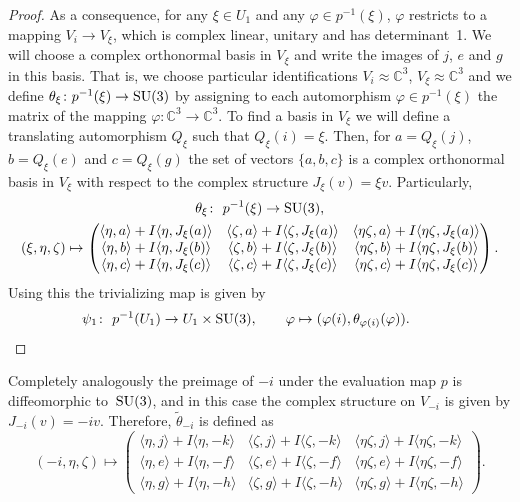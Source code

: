 \documentclass[10pt,a4paper]{amsart}
\numberwithin{equation}{section}
\newcommand{\SC}{\mathbb{C}} %
\begin{document}
\begin{proof}
As a consequence, for any $\xi \in U_1 $ and any $\varphi \in p^{-1}(\xi)$, $\varphi$ restricts to a mapping $V_i \rightarrow V_\xi$, which is complex linear, unitary and has determinant~1. We will choose a complex orthonormal basis in $V_\xi$ and write the images of $j$, $e$ and $g$ in this basis. That is, we choose particular identifications $V_i \approx \SC^3$, $V_\xi \approx \SC^3$ and we define $\theta_\xi \colon p^{-1}(\xi) \rightarrow {\rm SU}(3)$ by assigning to each automorphism $\varphi \in p^{-1}(\xi)$ the matrix of the mapping $\varphi\colon \SC^3 \rightarrow \SC^3$. To find a basis in $V_\xi$ we will define a translating automorphism $Q_\xi$ such that $Q_\xi(i)=\xi$. Then, for $a=Q_\xi(j)$, $b=Q_\xi(e)$ and $c=Q_\xi(g)$ the set of vectors $\{a,b,c\}$ is a complex orthonormal basis in $V_\xi$ with respect to the complex structure $J_\xi(v)=\xi v$. Particularly,
 \begin{gather}
\theta_\xi \colon \ p^{-1}(\xi) \rightarrow {\rm SU}(3),\nonumber\\
 (\xi,\eta,\zeta) \mapsto
 \begin{pmatrix}
 \langle \eta,a \rangle + I\langle \eta,J_\xi(a) \rangle & \langle \zeta,a \rangle + I\langle \zeta,J_\xi(a) \rangle & \langle \eta \zeta,a \rangle + I\langle \eta \zeta,J_\xi(a) \rangle\\
 \langle \eta,b \rangle +I\langle \eta,J_\xi(b) \rangle & \langle \zeta,b \rangle +I\langle \zeta,J_\xi(b) \rangle & \langle \eta \zeta,b \rangle +I\langle \eta \zeta,J_\xi(b) \rangle\\
 \langle \eta,c \rangle +I\langle \eta,J_\xi(c) \rangle & \langle \zeta,c \rangle +I\langle \zeta,J_\xi(c) \rangle & \langle \eta \zeta,c \rangle +I\langle \eta \zeta,J_\xi(c) \rangle
 \end{pmatrix}.\label{eq:thetaxi}
\end{gather}
 Using this the trivializing map is given by
 \begin{gather*} \psi_1\colon \ p^{-1}(U_1) \rightarrow U_1 \times {\rm SU}(3), \qquad \varphi \mapsto (\varphi(i),\theta_{\varphi(i)}(\varphi) ) .\tag*{\qed}\end{gather*}
\renewcommand{\qed}{}
\end{proof}

Completely analogously the preimage of $-i$ under the evaluation map $p$ is diffeomorphic to~${\rm SU}(3)$, and in this case the complex structure on $V_{-i}$ is given by $J_{-i}(v)=-iv$. Therefore, $\tilde{\theta}_{-i}$ is defined as
\[ (-i,\eta,\zeta) \mapsto
\begin{pmatrix}
\langle \eta,j \rangle + I\langle \eta,-k \rangle & \langle \zeta,j \rangle + I\langle \zeta,-k \rangle & \langle \eta \zeta,j \rangle + I\langle \eta \zeta,-k \rangle\\
\langle \eta,e \rangle +I\langle \eta,-f \rangle & \langle \zeta,e \rangle +I\langle \zeta,-f \rangle & \langle \eta \zeta,e \rangle +I\langle \eta \zeta,-f \rangle\\
\langle \eta,g \rangle +I\langle \eta,-h \rangle & \langle \zeta,g \rangle +I\langle \zeta,-h \rangle & \langle \eta \zeta,g \rangle +I\langle \eta \zeta,-h \rangle
\end{pmatrix}.
\]
\end{document}
